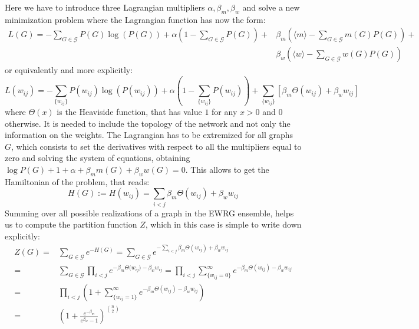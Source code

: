 \documentclass[a4paper]{article}
\begin{document}
Here we have to introduce three Lagrangian multipliers $\alpha,\beta_m,\beta_w$ and solve a new  minimization problem where the Lagrangian function has now the form:
\begin{align}
L(G) = - \sum \limits_{G \in \mathcal{G}} P(G)\log\left( P(G) \right ) +  \alpha \left(1-\sum \limits_{G \in \mathcal{G}} P(G) \right) +& \beta_m \left( \langle m \rangle - \sum \limits_{G \in \mathcal{G}} m(G) P(G) \right)  +\nonumber \\ &\beta_w \left( \langle w \rangle - \sum \limits_{G \in \mathcal{G}} w(G) P(G) \right) 
\end{align}
or equivalently and more explicitly:
\begin{equation}
L(w_{ij}) = - \sum \limits_{\{ w_{ij} \}} P(w_{ij})\log\left( P(w_{ij}) \right) + \alpha \left(1 - \sum \limits_{\{ w_{ij} \}} P(w_{ij}) \right) + \sum \limits_{\{ w_{ij} \}} \left[ \beta_m \Theta(w_{ij}) + \beta_w w_{ij} \right]
\end{equation}
where $\Theta(x)$ is the Heaviside function, that has value $1$ for any $x>0$ and $0$ otherwise. It is needed to include the topology of the network and not only the information on the weights.
The Lagrangian has to be extremized for all graphs $G$, which consists to set the derivatives with respect to all the multipliers equal to zero and solving the system of equations, obtaining $\log P(G) + 1 + \alpha + \beta_m m(G) + \beta_w w(G) = 0$. This allows to get the Hamiltonian of the problem, that reads:
\begin{equation}\label{eq:ewrg_hamiltonian}
H(G) := H(w_{ij}) = \sum_{i<j}  \beta_m \Theta(w_{ij}) + \beta_w w_{ij} 
\end{equation}
Summing over all possible realizations of a graph in the EWRG ensemble,
helps us to compute the partition function $Z$, which in this case is
simple to write down explicitly:
\begin{align}
Z(G) = &\sum \limits_{G \in \mathcal{G}} e^{-H(G)}  = \sum \limits_{G \in \mathcal{G}} e^{- \sum \limits_{i<j} \beta_m \Theta(w_{ij}) + \beta_w w_{ij} }\nonumber \\ = & \sum \limits_{G \in \mathcal{G}} \prod_{i<j} e^{-\beta_m \Theta({w_{ij})} - \beta_w w_{ij}} = \prod \limits_{i<j} \sum \limits_{\{ w_{ij}=0 \}}^{\infty} e^{-\beta_m \Theta({w_{ij}}) - \beta_w w_{ij}} \nonumber \\
= & \prod \limits_{i<j} \left( 1 + \sum \limits_{\{ w_{ij}=1 \}}^{\infty} e^{-\beta_m \Theta({w_{ij}}) - \beta_w w_{ij}} \right) \nonumber \\
= & \left( 1 + \frac{e^{-\beta_m}}{e^{\beta_w}-1} \right)^{\binom{n}{2}} 
\end{align} 
\end{document}
